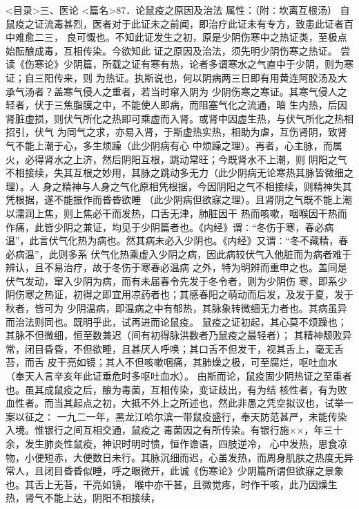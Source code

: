 \documentclass[a4paper,12pt,UTF8,twoside]{ctexbook}
\begin{document}
<目录>三、医论
<篇名>87．论鼠疫之原因及治法
属性：（附∶坎离互根汤） 
自鼠疫之证流毒甚烈，医者对于此证未之前闻，即治疗此证未有专方，致患此证者百中难愈二三， 
良可慨也。不知此证发生之初，原是少阴伤寒中之热证类，至极点始酝酿成毒，互相传染。今欲知此 
证之原因及治法，须先明少阴伤寒之热证。 
尝读《伤寒论》少阴篇，所载之证有寒有热，论者多谓寒水之气直中于少阴，则为寒证；自三阳传来，则 
为热证。执斯说也，何以阴病两三日即有用黄连阿胶汤及大承气汤者？盖寒气侵人之重者，若当时窜入阴为 
少阴伤寒之寒证。其寒气侵人之轻者，伏于三焦脂膜之中，不能使人即病，而阻塞气化之流通，暗 
生内热，后因肾脏虚损，则伏气所化之热即可乘虚而入肾。或肾中因虚生热，与伏气所化之热相招引，伏气 
为同气之求，亦易入肾，于斯虚热实热，相助为虐，互伤肾阴，致肾气不能上潮于心，多生烦躁（此少阴病有心 
中烦躁之理）。再者，心主脉，而属火，必得肾水之上济，然后阴阳互根，跳动常旺；今既肾水不上潮，则 
阴阳之气不相接续，失其互根之妙用，其脉之跳动多无力（此少阴病无论寒热其脉皆微细之理）。人 
身之精神与人身之气化原相凭根据，今因阴阳之气不相接续，则精神失其凭根据，遂不能振作而昏昏欲睡 
（此少阴病但欲寐之理）。且肾阴之气既不能上潮以濡润上焦，则上焦必干而发热，口舌无津，肺脏因干 
热而咳嗽，咽喉因干热而作痛，此皆少阴之兼证，均见于少阴篇者也。《内经》谓∶“冬伤于寒，春必病 
温”，此言伏气化热为病也。然其病未必入少阴也。《内经》又谓∶“冬不藏精，春必病温”，此则多系 
伏气化热乘虚入少阴之病，因此病较伏气入他脏而为病者难于辨认，且不易治疗，故于冬伤于寒春必温病 
之外，特为明辨而重申之也。盖同是伏气发动，窜入少阴为病，而有未届春令先发于冬令者，则为少阴伤 
寒，即系少阴伤寒之热证，初得之即宜用凉药者也；其感春阳之萌动而后发，及发于夏，发于秋者，皆可为 
少阴温病，即温病之中有郁热，其脉象转微细无力者也。其病虽异而治法则同也。既明乎此，试再进而论鼠疫。 
鼠疫之证初起，其心莫不烦躁也；其脉不但微细，恒至数兼迟（间有初得脉洪数者乃鼠疫之最轻者）； 
其精神颓败异常，闭目昏昏，不但欲睡，且甚厌人呼唤；其口舌不但发干，视其舌上，毫无舌苔，而舌 
皮干亮如镜；其人不但咳嗽咽痛，其肺燥之极，可至腐烂，呕吐血水（奉天人言辛亥年此证垂危时多呕吐血水）。 
由斯而论，鼠疫固少阴热证之至重者也。虽其成鼠疫之后，酿为毒菌，互相传染，变证歧出，有为结 
核性者，有为败血性者。而当其起点之初，大抵不外上之所述也，然此非愚之凭空拟议也，试举一案以征之∶ 
一九二一年，黑龙江哈尔滨一带鼠疫盛行，奉天防范甚严，未能传染入境。惟银行之间互相交通，鼠疫之 
毒菌因之有所传染。有银行施××，年三十余，发生肺炎性鼠疫，神识时明时愦，恒作谵语，四肢逆冷， 
心中发热，思食凉物，小便短赤，大便数日未行。其脉沉细而迟，心虽发热，而周身肌肤之热度无异 
常人，且闭目昏昏似睡，呼之眼微开，此诚《伤寒论》少阴篇所谓但欲寐之景象也。其舌上无苔，干亮如镜， 
喉中亦干甚，且微觉疼，时作干咳，此乃因燥生热，肾气不能上达，阴阳不相接续， 
\end{document}
